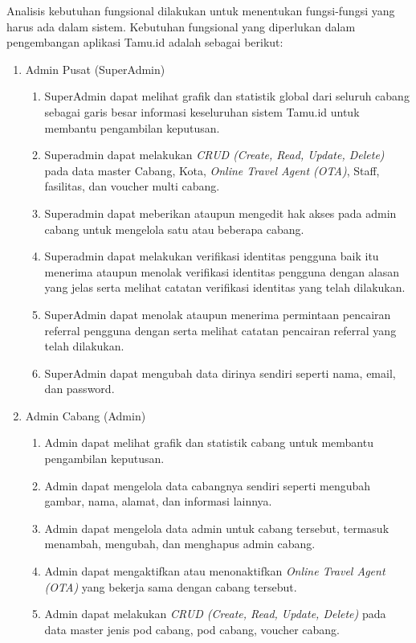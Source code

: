 Analisis kebutuhan fungsional dilakukan untuk menentukan fungsi-fungsi yang harus ada dalam sistem. Kebutuhan fungsional yang diperlukan dalam pengembangan aplikasi Tamu.id adalah sebagai berikut:

\begin{enumerate}
    \item Admin Pusat (SuperAdmin)
          \begin{enumerate}
              \item SuperAdmin dapat melihat grafik dan statistik global dari seluruh cabang sebagai garis besar informasi keseluruhan sistem Tamu.id untuk membantu pengambilan keputusan.
              \item Superadmin dapat melakukan \textit{CRUD (Create, Read, Update, Delete)}  pada data master Cabang, Kota, \textit{Online Travel Agent (OTA)}, Staff, fasilitas, dan voucher multi cabang.
              \item Superadmin dapat meberikan ataupun mengedit hak akses pada admin cabang untuk mengelola satu atau beberapa cabang.
              \item Superadmin dapat melakukan verifikasi identitas pengguna baik itu menerima ataupun menolak verifikasi identitas pengguna dengan alasan yang jelas serta melihat catatan verifikasi identitas yang telah dilakukan.
              \item SuperAdmin dapat menolak ataupun menerima permintaan pencairan referral pengguna dengan serta melihat catatan pencairan referral yang telah dilakukan.
              \item SuperAdmin dapat mengubah data dirinya sendiri seperti nama, email, dan password.
          \end{enumerate}
    \item Admin Cabang (Admin)
          \begin{enumerate}
              \item Admin dapat melihat grafik dan statistik cabang untuk membantu pengambilan keputusan.
              \item Admin dapat mengelola data cabangnya sendiri seperti mengubah gambar, nama, alamat, dan informasi lainnya.
              \item Admin dapat mengelola data admin untuk cabang tersebut, termasuk menambah, mengubah, dan menghapus admin cabang.
              \item Admin dapat mengaktifkan atau menonaktifkan \textit{Online Travel Agent (OTA)} yang bekerja sama dengan cabang tersebut.
              \item Admin dapat melakukan \textit{CRUD (Create, Read, Update, Delete)} pada data master jenis pod cabang, pod cabang, voucher cabang.

\end{enumerate}
\end{enumerate}
